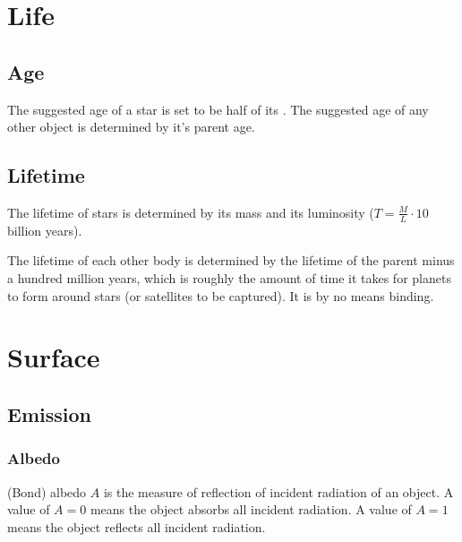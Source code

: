 \documentclass[letterpaper,10pt,english]{sphinxmanual}
\begin{document}
\section{Life}
\label{\detokenize{quantities/life/life:life}}\label{\detokenize{quantities/life/life::doc}}

\subsection{Age}
\label{\detokenize{quantities/life/age:age}}\label{\detokenize{quantities/life/age::doc}}\label{\detokenize{quantities/life/age:id1}}
\sphinxAtStartPar
The suggested age of a star is set to be half of its {\hyperref[\detokenize{quantities/life/lifetime:id1}]{}}.
The suggested age of any other object is determined by it’s
parent age.


\subsection{Lifetime}
\label{\detokenize{quantities/life/lifetime:lifetime}}\label{\detokenize{quantities/life/lifetime::doc}}\label{\detokenize{quantities/life/lifetime:id1}}
\sphinxAtStartPar
The lifetime of stars is determined by its mass and its luminosity (\(T=\frac{M}{L} \cdot 10\) billion years).

\sphinxAtStartPar
The lifetime of each other body is determined by the lifetime of the parent
minus a hundred million years, which is roughly the amount of time it takes
for planets to form around stars (or satellites to be captured). It is by
no means binding.


\section{Surface}
\label{\detokenize{quantities/surface/surface:surface}}\label{\detokenize{quantities/surface/surface::doc}}

\subsection{Emission}
\label{\detokenize{quantities/surface/emission/emission:emission}}\label{\detokenize{quantities/surface/emission/emission::doc}}

\subsubsection{Albedo}
\label{\detokenize{quantities/surface/emission/albedo:albedo}}\label{\detokenize{quantities/surface/emission/albedo::doc}}\label{\detokenize{quantities/surface/emission/albedo:id1}}
\sphinxAtStartPar
(Bond) albedo \(A\) is the measure of reflection of incident radiation of an object.
A value of \(A = 0\) means the object absorbs all incident radiation.
A value of \(A = 1\) means the object reflects all incident radiation.
\end{document}
